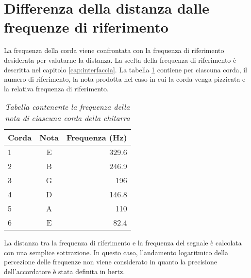 \section{Differenza della distanza dalle frequenze di riferimento}\label{cap:distanza}

La frequenza della corda viene confrontata con la frequenza di riferimento desiderata per valutarne la distanza.
La scelta della frequenza di riferimento è descritta nel capitolo \ref{cap:interfaccia}.
La tabella \ref{tab:frequenze_riferimento} contiene per ciascuna corda, il numero di riferimento, la nota prodotta nel caso in cui la corda venga pizzicata e la relativa frequenza di riferimento.

	\begin{table}[h]
	\center
	\begin{tabular}{|l|c|r|}
		\hline
		Corda	& 	Nota    & Frequenza (Hz) \\
		\hline
		1	&	E	&	329.6    \\
		2	&	B	&	246.9    \\
		3	&	G	&	196      \\
		4	&	D	&	146.8    \\
		5	&	A	&	110      \\
		6	&	E	&	82.4     \\		
		\hline
	\end{tabular}
	\caption{\textit{Tabella contenente la frequenza della nota di ciascuna corda della chitarra \cite{giordano2009reasoning}}}
	\label{tab:frequenze_riferimento}
	\end{table}

La distanza tra la frequenza di riferimento e la frequenza del segnale è calcolata con una semplice sottrazione.
In questo caso, l'andamento logaritmico della percezione delle frequenze non viene considerato in quanto la precisione dell'accordatore è stata definita in hertz.
